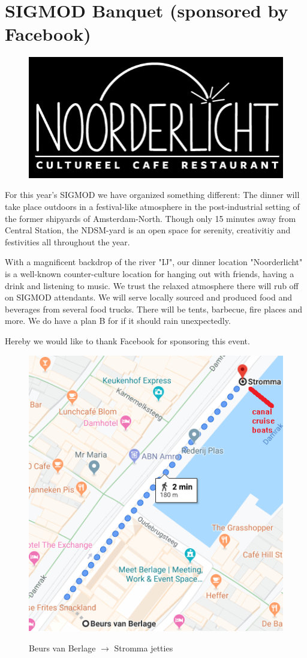 
\section{SIGMOD Banquet (sponsored by Facebook)}

\begin{figure}[h]
\centering
\includegraphics[width=.5\textwidth]{images/noorderlicht.jpg}
\end{figure}

For this year's SIGMOD we have organized something different: The dinner will take place outdoors in a festival-like atmosphere in the post-industrial setting of the former shipyards of Amsterdam-North. Though only 15 minutes away from Central Station, the NDSM-yard is an open space for serenity, creativitiy and festivities all throughout the year.

With a magnificent backdrop of the river "IJ", our dinner location "Noorderlicht" is a well-known counter-culture location for hanging out with friends, having a drink and listening to music. We trust the relaxed atmosphere there will rub off on SIGMOD attendants. We will serve locally sourced and produced food and beverages from several food trucks. There will be tents, barbecue, fire places and more. We do have a plan B for if it should rain unexpectedly.

Hereby we would like to thank Facebook for sponsoring this event.

\begin{figure}[h]
\centering
\includegraphics[width=.7\textwidth]{images/berlage-stromma.png}

Beurs van Berlage $\rightarrow$ Stromma jetties
\end{figure}


